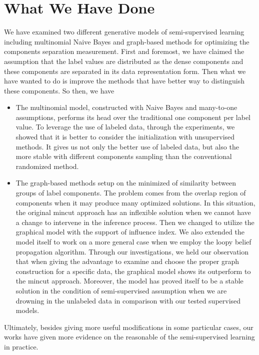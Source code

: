 \section{What We Have Done}
We have examined two different generative models of semi-supervised learning including multinomial Naive Bayes and graph-based methods for optimizing the components separation measurement. First and foremost, we have claimed the assumption that the label values are distributed as the dense components and these components are separated in its data representation form. Then what we have wanted to do is improve the methods that have better way to distinguish these components. So then, we have
\begin{itemize}
	\item The multinomial model, constructed with Naive Bayes and many-to-one assumptions, performs its head over the traditional one component per label value. To leverage the use of labeled data, through the experiments, we showed that it is better to consider the initialization with unsupervised methods. It gives us not only the better use of labeled data, but also the more stable with different components sampling than the conventional randomized method.
	
	\item The graph-based methods setup on the minimized of similarity between groups of label components. The problem comes from the overlap region of components when it may produce many optimized solutions. In this situation, the original mincut approach has an inflexible solution when we cannot have a change to intervene in the inference process. Then we changed to utilize the graphical model with the support of influence index. We also extended the model itself to work on a more general case when we employ the loopy belief propagation algorithm. Through our investigations, we held our observation that when giving the advantage to examine and choose the proper graph construction for a specific data, the graphical model shows its outperform to the mincut approach. Moreover, the model has proved itself to be a stable solution in the condition of semi-supervised assumption when we are drowning in the unlabeled data in comparison with our tested supervised models.
\end{itemize}

Ultimately, besides giving more useful modifications in some particular cases, our works have given more evidence on the reasonable of the semi-supervised learning in practice.
 
